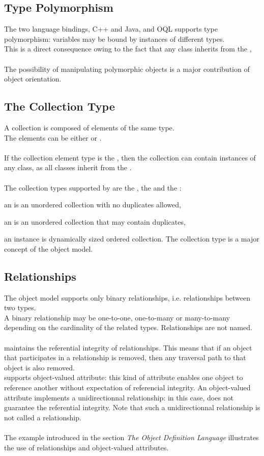 \subsection{Type Polymorphism}
The two language bindings, C++ and Java, and \eyedb OQL supports
type polymorphism: variables may be bound by instances of different types.
\\
This is a direct consequence owing to the fact that any \eyedb class
inherits from the ,
\\
\\
The possibility of manipulating polymorphic objects is a
major contribution of object orientation.
\subsection{The Collection Type}
A collection is composed of elements of the same type.
\\
The elements can be either  or .
\\
\\
If the collection element type is the , then
the collection can contain instances of any class, as all
classes inherit from the .
\\
\\
The collection types supported by \eyedb are the , the
 and the :
\bi
\item an  is an unordered collection with no duplicates allowed,
\item an  is an unordered collection that may contain duplicates,
\item an  instance is dynamically sized ordered collection.
\ei
The collection type is a major concept of the \eyedb object model.

\subsection{Relationships}
The \eyedb object model supports only binary relationships, i.e. relationships
between two types.
\\
A binary relationship may be one-to-one, one-to-many or many-to-many
depending on the cardinality of the related types.
Relationships are not named.
\\
\\
\eyedb maintains the referential integrity of
relationships. This means that if an object that participates
in a relationship is removed, then any traversal path to that object
is also removed.
\\
\eyedb supports object-valued attribute: this kind of attribute enables one
object to reference another without expectation of referencial integrity.
An object-valued attribute implements a unidirectionnal relationship:
in this case, \eyedb does not guarantee the referential integrity.
Note that such a unidirectionnal relationship is not called a relationship.
\\
\\
The example introduced in the section \emph{The Object Definition Language}
illustrates the use of relationships and object-valued attributes.
